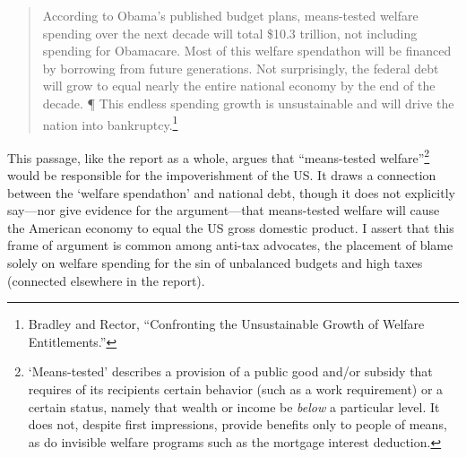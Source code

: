 \documentclass[
]{article}
\let\rmarkdownfootnote\footnote%
\def\footnote{\protect\rmarkdownfootnote}
\begin{document}
\begin{quote}
According to Obama's published budget plans, means-tested welfare
spending over the next decade will total \$10.3 trillion, not including
spending for Obamacare. Most of this welfare spendathon will be financed
by borrowing from future generations. Not surprisingly, the federal debt
will grow to equal nearly the entire national economy by the end of the
decade. ¶ This endless spending growth is unsustainable and will drive
the nation into bankruptcy.\footnote{Bradley and Rector, ``Confronting
  the Unsustainable Growth of Welfare Entitlements.''}
\end{quote}

This passage, like the report as a whole, argues that ``means-tested
welfare''\footnote{`Means-tested' describes a provision of a public good
  and/or subsidy that requires of its recipients certain behavior (such
  as a work requirement) or a certain status, namely that wealth or
  income be \emph{below} a particular level. It does not, despite first
  impressions, provide benefits only to people of means, as do invisible
  welfare programs such as the mortgage interest deduction.} would be
responsible for the impoverishment of the US. It draws a connection
between the `welfare spendathon' and national debt, though it does not
explicitly say---nor give evidence for the argument---that means-tested
welfare will cause the American economy to equal the US gross domestic
product. I assert that this frame of argument is common among anti-tax
advocates, the placement of blame solely on welfare spending for the sin
of unbalanced budgets and high taxes (connected elsewhere in the
report).
\end{document}
